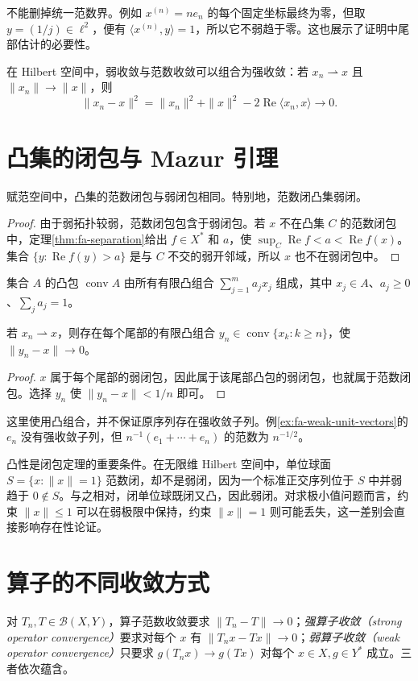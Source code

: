 不能删掉统一范数界。例如 $x^{(n)}=ne_n$ 的每个固定坐标最终为零，但取 $y=(1/j)\in\ell^2$，便有 $\langle x^{(n)},y\rangle=1$，所以它不弱趋于零。这也展示了证明中尾部估计的必要性。

在 Hilbert 空间中，弱收敛与范数收敛可以组合为强收敛：若 $x_n\rightharpoonup x$ 且 $\|x_n\|\to\|x\|$，则
\[
 \|x_n-x\|^2=\|x_n\|^2+\|x\|^2-2\operatorname{Re}\langle x_n,x\rangle\to0.
\]

\section{凸集的闭包与 Mazur 引理}
\begin{theorem}\label{thm:fa-convex-weak-closure}
赋范空间中，凸集的范数闭包与弱闭包相同。特别地，范数闭凸集弱闭。
\end{theorem}
\begin{proof}
由于弱拓扑较弱，范数闭包包含于弱闭包。若 $x$ 不在凸集 $C$ 的范数闭包中，定理\ref{thm:fa-separation}给出 $f\in X^*$ 和 $a$，使 $\sup_C\operatorname{Re}f<a<\operatorname{Re}f(x)$。集合 $\{y:\operatorname{Re}f(y)>a\}$ 是与 $C$ 不交的弱开邻域，所以 $x$ 也不在弱闭包中。
\end{proof}
集合 $A$ 的凸包 $\operatorname{conv}A$ 由所有有限凸组合 $\sum_{j=1}^ma_jx_j$ 组成，其中 $x_j\in A$、$a_j\geq0$、$\sum_ja_j=1$。
\begin{corollary}[Mazur 引理]\label{cor:fa-mazur}
若 $x_n\rightharpoonup x$，则存在每个尾部的有限凸组合 $y_n\in\operatorname{conv}\{x_k:k\geq n\}$，使 $\|y_n-x\|\to0$。
\end{corollary}
\begin{proof}
$x$ 属于每个尾部的弱闭包，因此属于该尾部凸包的弱闭包，也就属于范数闭包。选择 $y_n$ 使 $\|y_n-x\|<1/n$ 即可。
\end{proof}
这里使用凸组合，并不保证原序列存在强收敛子列。例\ref{ex:fa-weak-unit-vectors}的 $e_n$ 没有强收敛子列，但 $n^{-1}(e_1+\cdots+e_n)$ 的范数为 $n^{-1/2}$。

凸性是闭包定理的重要条件。在无限维 Hilbert 空间中，单位球面 $S=\{x:\|x\|=1\}$ 范数闭，却不是弱闭，因为一个标准正交序列位于 $S$ 中并弱趋于 $0\notin S$。与之相对，闭单位球既闭又凸，因此弱闭。对求极小值问题而言，约束 $\|x\|\leq1$ 可以在弱极限中保持，约束 $\|x\|=1$ 则可能丢失，这一差别会直接影响存在性论证。

\section{算子的不同收敛方式}
对 $T_n,T\in\mathcal B(X,Y)$，算子范数收敛要求 $\|T_n-T\|\to0$；\emph{强算子收敛（strong operator convergence）}要求对每个 $x$ 有 $\|T_nx-Tx\|\to0$；\emph{弱算子收敛（weak operator convergence）}只要求 $g(T_nx)\to g(Tx)$ 对每个 $x\in X,g\in Y^*$ 成立。三者依次蕴含。

